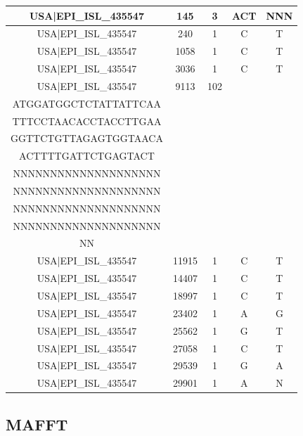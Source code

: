 \documentclass[a4paper,10pt]{article}
\begin{document}
\begin{longtable}{@{}ccccc@{}}
USA|EPI\_ISL\_435547 & 145 & 3 & ACT & NNN \\* \midrule
USA|EPI\_ISL\_435547 & 240 & 1 & C & T \\* \midrule
USA|EPI\_ISL\_435547 & 1058 & 1 & C & T \\* \midrule
USA|EPI\_ISL\_435547 & 3036 & 1 & C & T \\* \midrule
USA|EPI\_ISL\_435547 & 9113 & 102 & \begin{tabular}[c]{@{}c@{}}CTGACACACGTTATGTGCTC\\ ATGGATGGCTCTATTATTCAA\\ TTTCCTAACACCTACCTTGAA\\ GGTTCTGTTAGAGTGGTAACA\\ ACTTTTGATTCTGAGTACT\end{tabular} & \begin{tabular}[c]{@{}c@{}}NNNNNNNNNNNNNNNNNNNN\\ NNNNNNNNNNNNNNNNNNNN\\ NNNNNNNNNNNNNNNNNNNN\\ NNNNNNNNNNNNNNNNNNNN\\ NNNNNNNNNNNNNNNNNNNN\\ NN\end{tabular} \\* \midrule
USA|EPI\_ISL\_435547 & 11915 & 1 & C & T \\* \midrule
USA|EPI\_ISL\_435547 & 14407 & 1 & C & T \\* \midrule
USA|EPI\_ISL\_435547 & 18997 & 1 & C & T \\* \midrule
USA|EPI\_ISL\_435547 & 23402 & 1 & A & G \\* \midrule
USA|EPI\_ISL\_435547 & 25562 & 1 & G & T \\* \midrule
USA|EPI\_ISL\_435547 & 27058 & 1 & C & T \\* \midrule
USA|EPI\_ISL\_435547 & 29539 & 1 & G & A \\* \midrule
USA|EPI\_ISL\_435547 & 29901 & 1 & A & N \\* \bottomrule
\end{longtable}

\newpage
\subsection{MAFFT}
\end{document}
